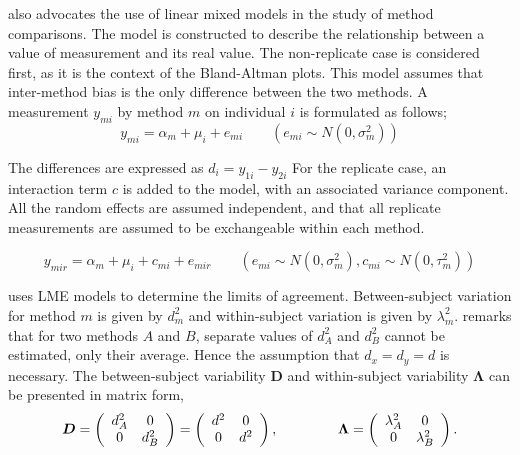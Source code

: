 \documentclass[12pt, a4paper]{report}
\theoremstyle{plain}
\theoremstyle{definition}
\theoremstyle{remark}
\begin{document}
\citet{BXC2004} also advocates the use of linear mixed models in
the study of method comparisons. The model is constructed to
describe the relationship between a value of measurement and its
real value. The non-replicate case is considered first, as it is
the context of the Bland-Altman plots. This model assumes that
inter-method bias is the only difference between the two methods.
A measurement $y_{mi}$ by method $m$ on individual $i$ is
formulated as follows;
\begin{equation}
y_{mi}  = \alpha_{m} + \mu_{i} + e_{mi} \qquad ( e_{mi} \sim
N(0,\sigma^{2}_{m}))
\end{equation}

The differences are expressed as $d_{i} = y_{1i} - y_{2i}$ For the
replicate case, an interaction term $c$ is added to the model,
with an associated variance component. All the random effects are
assumed independent, and that all replicate measurements are
assumed to be exchangeable within each method.

\begin{equation}
y_{mir}  = \alpha_{m} + \mu_{i} + c_{mi} + e_{mir} \qquad ( e_{mi}
\sim N(0,\sigma^{2}_{m}), c_{mi} \sim N(0,\tau^{2}_{m}))
\end{equation}

\citet{BXC2008} uses LME models to determine the limits of agreement. Between-subject variation for method $m$ is given by $d^2_{m}$ and within-subject variation is given by $\lambda^2_{m}$.  \citet{BXC2008} remarks that for two methods $A$ and $B$, separate values of $d^2_{A}$ and $d^2_{B}$ cannot be estimated, only their average. Hence the assumption that $d_{x}= d_{y}= d$ is necessary. The between-subject variability $\boldsymbol{D}$ and within-subject variability $\boldsymbol{\Lambda}$ can be presented in matrix form,\[
\boldsymbol{D} = \left(%
\begin{array}{cc}
d^2_{A}& 0 \\
0 & d^2_{B} \\
\end{array}%
\right)=\left(%
\begin{array}{cc}
d^2& 0 \\
0 & d^2\\
\end{array}%
\right),
\hspace{1.5cm}
\boldsymbol{\Lambda} = \left(%
\begin{array}{cc}
\lambda^2_{A}& 0 \\
0 & \lambda^2_{B} \\
\end{array}%
\right).
\]
\end{document}
